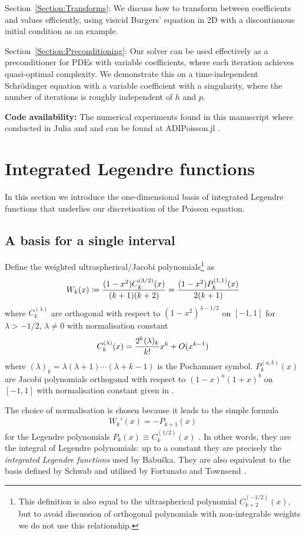 \documentclass[hidelinks,onefignum,onetabnum]{siamart220329}
\def\secref#1{Section~\ref{Section:#1}}
\begin{document}
\secref{Transforms}: We discuss how to transform between coefficients and values efficiently, using visicid Burgers' equation in 2D with a discontinuous initial
condition as an example.


\secref{Preconditioning}:  Our solver can be used effectively as a preconditioner for PDEs with variable coefficients, where each iteration achieves quasi-optimal complexity. We demonstrate this on a time-independent Schr\"odinger equation with a variable coefficient with a singularity, where the number of iterations is roughly independent of $h$ and $p$. 



\textbf{Code availability:} The numerical experiments found in this manuscript where conducted in Julia and and can be found at ADIPoisson.jl \cite{ADIPoisson.jl2024, adipoisson.jl-zenodo}.

\section{Integrated Legendre functions}\label{Section:integratedLegendre}

In this section we introduce the one-dimensional basis of integrated Legendre functions that underlies our discretisation of the Poisson equation.

\subsection{A basis for a single interval}
Define the weighted ultraspherical/Jacobi polynomials\footnote{This definition is also equal to the ultraspherical polynomial $C_{k+2}^{(-1/2)}(x)$, but to avoid discussion of orthogonal polynomials with non-integrable weights we do not use this relationship.} as
\[
W_k(x) \coloneqq  {(1-x^2) C_k^{(3/2)}(x) \over (k+1) (k+2)} = {(1-x^2) P_k^{(1,1)}(x) \over 2(k+1)} 
\]
where $C_k^{(\lambda)}$ are orthogonal with respect to $(1-x^2)^{\lambda - 1/2}$ on $[-1,1]$ for $\lambda > -1/2$, $\lambda \neq 0$  with normalisation constant
\[
	C_k^{(\lambda)}(x) = {2^k (\lambda)_k \over k!} x^k + O(x^{k-1})
\]
where $(\lambda)_k = \lambda(\lambda+1)\cdots(\lambda+k-1)$ is the Pochammer symbol.  $P_k^{(a,b)}(x)$ are Jacobi polynomials orthogonal with respect to $(1-x)^a(1+x)^b$ on $[-1,1]$ with normalisation constant given in \cite[18.3]{DLMF}.   
  
  The choice of normalisation is chosen because it leads to the simple formula
\begin{align}
  W_k'(x) = -P_{k+1}(x) \label{eq:deriv}
\end{align}
    for the Legendre polynomials $P_k(x) \equiv C_k^{(1/2)}(x)$ \cite[18.9.16]{DLMF}. In other words, they are the integral of Legendre polynomials: up to a constant they are precisely the \emph{integrated Legendre functions} used by Babuška. They are also equivalent to the basis defined by Schwab \cite[Ch.~3.1]{Schwab1998} and utilised by Fortunato and Townsend \cite{fortunato2020fast}.
\end{document}
